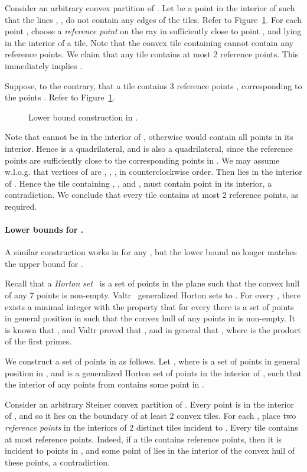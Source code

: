 \documentclass[11pt]{article}
\newcommand{\figlab}[1]{\label{fig:#1}}
\newcommand{\figref}[1]{Figure~\ref{fig:#1}}
\begin{document}
Consider an arbitrary convex partition of . Let  be a point in
the interior of  such that the lines , , do not
contain any edges of the tiles. Refer to \figref{lower-bound}.
For each point , choose a \emph{reference point}  on the ray  in  sufficiently close to point , and lying in the interior
of a tile.  Note that the convex tile containing  cannot contain
any reference points. We claim that any tile contains at most 2
reference points.  This immediately implies .

Suppose, to the contrary, that a tile  contains 3 reference
points , corresponding to the points .
Refer to \figref{lower-bound}.
\begin{figure} [htb]
\centerline{\epsfxsize=2.1in }
    \caption{Lower bound construction in .}
    \figlab{lower-bound}
\end{figure}
Note that  cannot be in the interior of , otherwise 
would contain all points  in its interior.
Hence  is a quadrilateral, and
 is also a quadrilateral, since the
reference points are sufficiently close to the corresponding points in
.  We may assume w.l.o.g. that
vertices of  are , , ,  in
counterclockwise order. Then  lies in the interior of
. Hence the tile containing , , and ,
must contain point  in its interior, a contradiction. We conclude that
every tile  contains at most 2 reference points, as required.

\paragraph{Lower bounds for .} A similar
construction works in for any , but the lower bound no longer
matches the upper bound  for .

Recall that a \emph{Horton set}~\cite{H83} is a set  of  points
in the plane such that the convex hull of any 7 points is non-empty.
Valtr~\cite{Va92} generalized Horton sets to . For every
, there exists a minimal integer  with the property
that for every  there is a set  of  points in general
position in  such that the convex hull of any  points
in  is non-empty. It is known that , and Valtr proved that
, and in general that , where
 is the product of the first  primes.

We construct a set  of  points in  as follows.
Let , where  is a set of  points in general
position in , and  is a generalized Horton set of 
points in the interior of , such that the interior of any
 points from  contains some point in .

Consider an arbitrary Steiner convex partition of . Every point
 is in the interior of , and so it lies on the
boundary of at least 2 convex tiles. For each , place two
\emph{reference points} in the interiors of 2 distinct tiles incident
to . Every tile contains at most  reference points. Indeed,
if a tile contains  reference points, then it is incident to
 points in , and some point of  lies in the interior of
the convex hull of these points, a contradiction.
\end{document}
